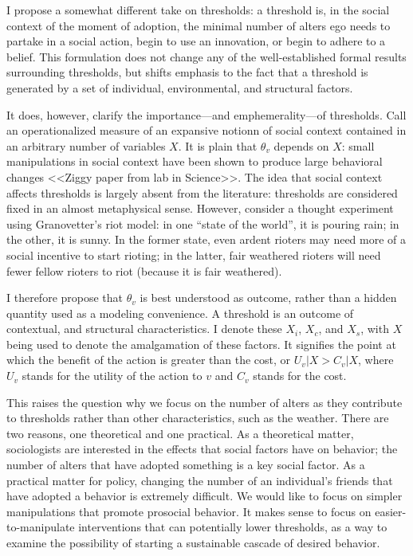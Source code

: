 \documentclass{article}
\begin{document}
I propose a somewhat different take on thresholds: a threshold is, in the social context of the moment of adoption, the minimal number of alters ego needs to partake in a social action, begin to use an innovation, or begin to adhere to a belief. This formulation does not change any of the well-established formal results surrounding thresholds, but shifts emphasis to the fact that a threshold is generated by a set of individual, environmental, and structural factors. 

It does, however, clarify the importance---and emphemerality---of thresholds. Call an operationalized measure of an expansive notionn of social context contained in an arbitrary number of variables $X$. It is plain that $\theta_v$ depends on $X$: small manipulations in social context have been shown to produce large behavioral changes <<Ziggy paper from lab in Science>>. The idea that social context affects thresholds is largely absent from the literature: thresholds are considered fixed in an almost metaphysical sense. However, consider a thought experiment using Granovetter's riot model: in one ``state of the world'', it is pouring rain; in the other, it is sunny. In the former state, even ardent rioters may need more of a social incentive to start rioting; in the latter, fair weathered rioters will need fewer fellow rioters to riot (because it is fair weathered).

I therefore propose that $\theta_v$ is best understood as outcome, rather than a hidden quantity used as a modeling convenience. A threshold is an outcome of contextual, and structural characteristics. I denote these $X_i$, $X_c$, and $X_s$, with $X$ being used to denote the amalgamation of these factors. It signifies the point at which the benefit of the action is greater than the cost, or $U_v|X > C_v|X$, where $U_v$ stands for the utility of the action to $v$ and $C_v$ stands for the cost.

This raises the question why we focus on the number of alters as they contribute to thresholds rather than other characteristics, such as the weather. There are two reasons, one theoretical and one practical. As a theoretical matter, sociologists are interested in the effects that social factors have on behavior; the number of alters that have adopted something is a key social factor. As a practical matter for policy, changing the number of an individual's friends that have adopted a behavior is extremely difficult. We would like to focus on simpler manipulations that promote prosocial behavior. It makes sense to focus on easier-to-manipulate interventions that can potentially lower thresholds, as a way to examine the possibility of starting a sustainable cascade of desired behavior. 
\end{document}
